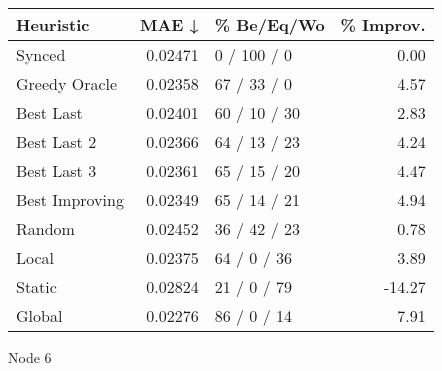 \begin{tabular}{lrlr}
\toprule
\textbf{Heuristic} & \textbf{MAE ↓} & \textbf{\% Be/Eq/Wo} & \textbf{\% Improv.} \\
\midrule
            Synced &        0.02471 &          0 / 100 / 0 &                0.00 \\
     Greedy Oracle &        0.02358 &          67 / 33 / 0 &                4.57 \\
         Best Last &        0.02401 &         60 / 10 / 30 &                2.83 \\
       Best Last 2 &        0.02366 &         64 / 13 / 23 &                4.24 \\
       Best Last 3 &        0.02361 &         65 / 15 / 20 &                4.47 \\
    Best Improving &        0.02349 &         65 / 14 / 21 &                4.94 \\
            Random &        0.02452 &         36 / 42 / 23 &                0.78 \\
             Local &        0.02375 &          64 / 0 / 36 &                3.89 \\
            Static &        0.02824 &          21 / 0 / 79 &              -14.27 \\
            Global &        0.02276 &          86 / 0 / 14 &                7.91 \\
\bottomrule
\end{tabular}
\caption{Node 6}
\label{tab:iid_lr01_le1_bs4_6}
